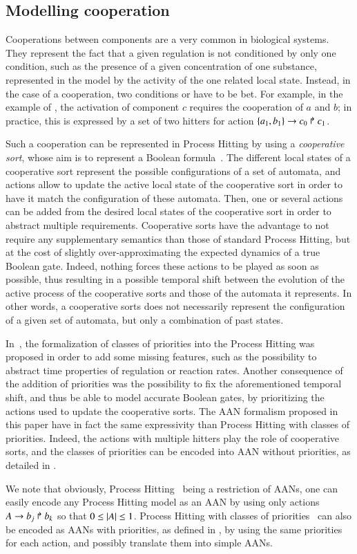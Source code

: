 \subsection{Modelling cooperation}
\label{ssec:cooperation}

Cooperations between components are a very common in biological systems.
They represent the fact that a given regulation is not conditioned by only one condition,
such as the presence of a given concentration of one substance,
represented in the model by the activity of the one related local state.
Instead, in the case of a cooperation, two conditions or have to be bet.
For example, in the example of ,
the activation of component $c$ requires the cooperation of $a$ and $b$;
in practice, this is expressed by a set of two hitters for action
$\{a_1, b_1\}\rightarrow c_0\Rsh c_1$.

Such a cooperation can be represented in Process Hitting by using a \emph{cooperative sort},
whose aim is to represent a Boolean formula~\cite{PMR10-TCSB}.
The different local states of a cooperative sort represent the possible configurations
of a set of automata,
and actions allow to update the active local state of the cooperative sort
in order to have it match the configuration of these automata.
Then, one or several actions can be added from the desired local states of the cooperative sort
in order to abstract multiple requirements.
Cooperative sorts have the advantage to not require any supplementary semantics
than those of standard Process Hitting,
but at the cost of slightly over-approximating the expected dynamics of a true Boolean gate.
Indeed, nothing forces these actions to be played as soon as possible,
thus resulting in a possible temporal shift between the evolution
of the active process of the cooperative sorts and those of the automata it represents.
In other words, a cooperative sorts does not necessarily represent the configuration
of a given set of automata, but only a combination of past states.

In~\cite{FPMR13-CS2Bio}, the formalization of classes of priorities into the Process Hitting
was proposed in order to add some missing features,
such as the possibility to abstract time properties of regulation or reaction rates.
Another consequence of the addition of priorities was the possibility to fix
the aforementioned temporal shift, and thus be able to model accurate Boolean gates,
by prioritizing the actions used to update the cooperative sorts.
The AAN formalism proposed in this paper have in fact the same expressivity than
Process Hitting with classes of priorities.
Indeed, the actions with multiple hitters play the role of cooperative sorts,
and the classes of priorities can be encoded into AAN without priorities,
as detailed in .

We note that obviously, Process Hitting~\cite{PMR10-TCSB} being a restriction of AANs,
one can easily encode any Process Hitting model as an AAN by using only actions
$A\rightarrow b_j\Rsh b_k$ so that $0 \leq |A| \leq 1$.
Process Hitting with classes of priorities~\cite{FPMR13-CS2Bio} can also be encoded as AANs
with priorities, as defined in ,
by using the same priorities for each action,
and possibly translate them into simple AANs.
